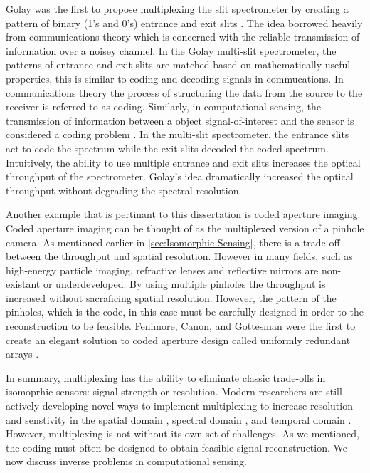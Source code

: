 Golay was the first to propose multiplexing the slit spectrometer by creating a pattern of binary (1's and 0's) entrance and exit slits \cite{golay1949multi}. The idea borrowed heavily from communications theory which is concerned with the reliable transmission of information over a noisey channel. In the Golay multi-slit spectrometer, the patterns of entrance and exit slits are matched based on mathematically useful properties, this is similar to coding and decoding signals in commucations. In communications theory the process of structuring the data from the source to the receiver is referred to as \gls{coding}. Similarly, in computational sensing, the transmission of information between a object signal-of-interest and the sensor is considered a coding problem \cite{brady2009optical}. In the multi-slit spectrometer, the entrance slits act to code the spectrum while the exit slits decoded the coded spectrum. Intuitively, the ability to use multiple entrance and exit slits increases the optical throughput of the spectrometer. Golay's idea dramatically increased the optical throughput without degrading the spectral resolution. 

Another example that is pertinant to this dissertation is coded aperture imaging. Coded aperture imaging can be thought of as the multiplexed version of a pinhole camera. As mentioned earlier in \autoref{sec:Isomorphic Sensing}, there is a trade-off between the throughput and spatial resolution. However in many fields, such as high-energy particle imaging, refractive lenses and reflective mirrors are non-existant or underdeveloped. By using multiple pinholes the throughput is increased without sacraficing spatial resolution. However, the pattern of the pinholes, which is the code, in this case must be carefully designed in order to the reconstruction to be feasible. Fenimore, Canon, and Gottesman were the first to create an elegant solution to coded aperture design called uniformly redundant arrays \cite{fenimore1978coded, gottesman1989new}.

In summary, multiplexing has the ability to eliminate classic trade-offs in isomoprhic sensors: signal strength or resolution. Modern researchers are still actively developing novel ways to implement multiplexing to increase resolution and senstivity in the spatial domain \cite{duarte2008single, townsend2012static}, spectral domain \cite{gehm2006static, tsai2013coded}, and temporal domain \cite{holloway2012flutter,llull2013coded}. However, multiplexing is not without its own set of challenges. As we mentioned, the coding must often be designed to obtain feasible signal reconstruction. We now discuss inverse problems in computational sensing.

